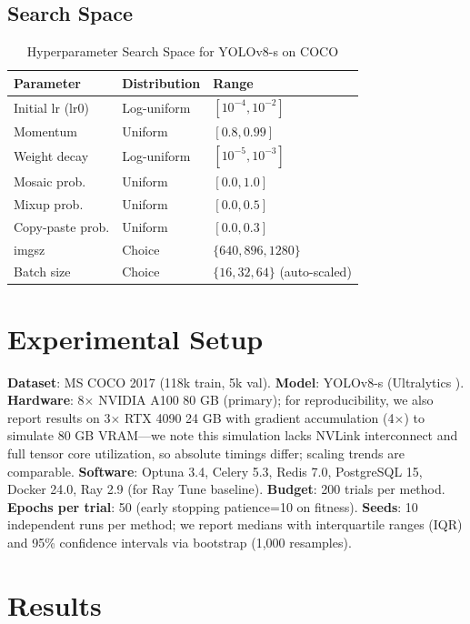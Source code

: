 \documentclass[10pt,twocolumn,letterpaper]{article}
\begin{document}
\subsection{Search Space}
\begin{table}[htbp]
\centering
\caption{Hyperparameter Search Space for YOLOv8-s on COCO}
\label{tab:search_space}
\begin{tabular}{@{}lll@{}}
\toprule
Parameter & Distribution & Range \\ \midrule
Initial lr (lr0) & Log-uniform & $[10^{-4}, 10^{-2}]$ \\
Momentum & Uniform & $[0.8, 0.99]$ \\
Weight decay & Log-uniform & $[10^{-5}, 10^{-3}]$ \\
Mosaic prob. & Uniform & $[0.0, 1.0]$ \\
Mixup prob. & Uniform & $[0.0, 0.5]$ \\
Copy-paste prob. & Uniform & $[0.0, 0.3]$ \\
imgsz & Choice & $\{640, 896, 1280\}$ \\
Batch size & Choice & $\{16, 32, 64\}$ (auto-scaled) \\ \bottomrule
\end{tabular}
\end{table}

\section{Experimental Setup}
\textbf{Dataset}: MS COCO 2017 (118k train, 5k val). \textbf{Model}: YOLOv8-s (Ultralytics \cite{jocher2023ultralytics}). \textbf{Hardware}: 8$\times$ NVIDIA A100 80 GB (primary); for reproducibility, we also report results on 3$\times$ RTX 4090 24 GB with gradient accumulation (4$\times$) to simulate 80 GB VRAM---we note this simulation lacks NVLink interconnect and full tensor core utilization, so absolute timings differ; scaling trends are comparable. \textbf{Software}: Optuna 3.4, Celery 5.3, Redis 7.0, PostgreSQL 15, Docker 24.0, Ray 2.9 (for Ray Tune baseline). \textbf{Budget}: 200 trials per method. \textbf{Epochs per trial}: 50 (early stopping patience=10 on fitness). \textbf{Seeds}: 10 independent runs per method; we report medians with interquartile ranges (IQR) and 95\% confidence intervals via bootstrap (1,000 resamples).

\section{Results}
\end{document}
